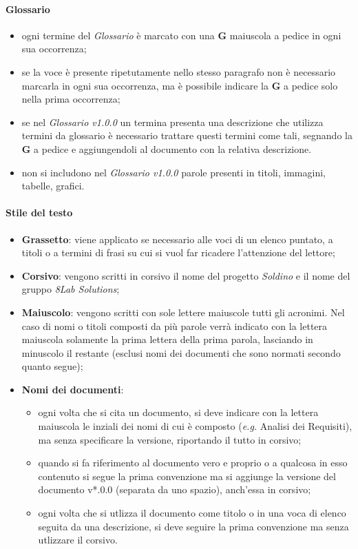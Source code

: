 		\paragraph{Glossario}
		\begin{itemize}
			\item ogni termine del \textit{Glossario} è marcato con una \textbf{G} maiuscola a pedice in ogni sua occorrenza;
			\item se la voce è presente ripetutamente nello stesso paragrafo non è necessario marcarla in ogni sua occorrenza, ma è possibile indicare la \textbf{G} a pedice solo nella prima occorrenza;
			\item se nel \textit{Glossario v1.0.0} un termina presenta una descrizione che utilizza termini da glossario è necessario trattare questi termini come tali, segnando la \textbf{G} a pedice e aggiungendoli al documento con la relativa descrizione.
			\item non si includono nel \textit{Glossario v1.0.0} parole presenti in titoli, immagini, tabelle, grafici.
		\end{itemize}			
		\paragraph{Stile del testo}
		\begin{itemize}
			\item \textbf{Grassetto}:
			viene applicato se necessario alle voci di un elenco puntato, a titoli o a termini di frasi su cui si vuol far ricadere l'attenzione del lettore;
			\item \textbf{Corsivo}: vengono scritti in corsivo il nome del progetto \textit{Soldino} e il nome del gruppo \textit{8Lab Solutions};
			\item \textbf{Maiuscolo}: vengono scritti con sole lettere maiuscole tutti gli acronimi. Nel caso di nomi o titoli composti da più parole verrà indicato con la lettera maiuscola solamente la prima lettera della prima parola, lasciando in minuscolo il restante (esclusi nomi dei documenti che sono normati secondo quanto segue);
			\item \textbf{Nomi dei documenti}:
			\begin{itemize}
				\item ogni volta che si cita un documento, si deve indicare con la lettera maiuscola le inziali dei nomi di cui è composto (\textit{e.g.} Analisi dei Requisiti), ma senza specificare la versione, riportando il tutto in corsivo;
				\item quando si fa riferimento al documento vero e proprio o a qualcosa in esso contenuto si segue la prima convenzione ma si aggiunge la versione del documento v*.0.0 (separata da uno spazio), anch'essa in corsivo;
				\item ogni volta che si utlizza il documento come titolo o in una voca di elenco seguita da una descrizione, si deve seguire la prima convenzione ma senza utlizzare il corsivo.
			\end{itemize}
		\end{itemize}

